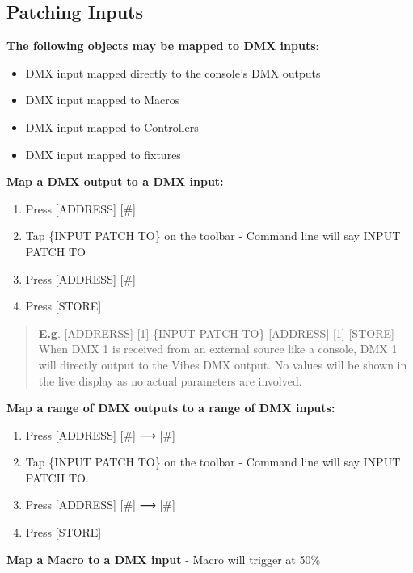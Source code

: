 \documentclass[
]{article}
\begin{document}
\hypertarget{patching-inputs}{%
\subsection{Patching Inputs}\label{patching-inputs}}

\textbf{The following objects may be mapped to DMX inputs}:

\begin{itemize}
\item
  DMX input mapped directly to the console's DMX outputs
\item
  DMX input mapped to Macros
\item
  DMX input mapped to Controllers
\item
  DMX input mapped to fixtures
\end{itemize}

\textbf{Map a DMX output to a DMX input:}

\begin{enumerate}
\def\labelenumi{\arabic{enumi}.}
\item
  Press {[}ADDRESS{]} {[}\#{]}
\item
  Tap \{INPUT PATCH TO\} on the toolbar - Command line will say INPUT PATCH TO
\item
  Press {[}ADDRESS{]} {[}\#{]}
\item
  Press {[}STORE{]}
\end{enumerate}

\begin{quote}
\textbf{E.g}. {[}ADDRERSS{]} {[}1{]} \{INPUT PATCH TO\} {[}ADDRESS{]} {[}1{]} {[}STORE{]} - When DMX 1 is received from an external source like a console, DMX 1 will directly output to the Vibes DMX output. No values will be shown in the live display as no actual parameters are involved.
\end{quote}

\textbf{Map a range of DMX outputs to a range of DMX inputs:}

\begin{enumerate}
\def\labelenumi{\arabic{enumi}.}
\item
  Press {[}ADDRESS{]} {[}\#{]} ⟶ {[}\#{]}
\item
  Tap \{INPUT PATCH TO\} on the toolbar - Command line will say INPUT PATCH TO.
\item
  Press {[}ADDRESS{]} {[}\#{]} ⟶ {[}\#{]}
\item
  Press {[}STORE{]}
\end{enumerate}

\textbf{Map a Macro to a DMX input} - Macro will trigger at 50\%
\end{document}
